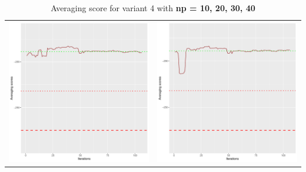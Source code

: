 \documentclass[]{scrartcl}
\begin{document}
\begin{table}[h!]
\begin{tabular}{cc}
\includegraphics[scale = 0.4]{./figs/asia/v4/30/avgBoundsEvolution-107.pdf} & 
\includegraphics[scale = 0.4]{./figs/asia/v4/40/avgBoundsEvolution-107.pdf} \\
\end{tabular}
\caption{Averaging score for variant 4 with \textbf{np =  10, 20, 30, 40}}
\end{table}
\end{document}

